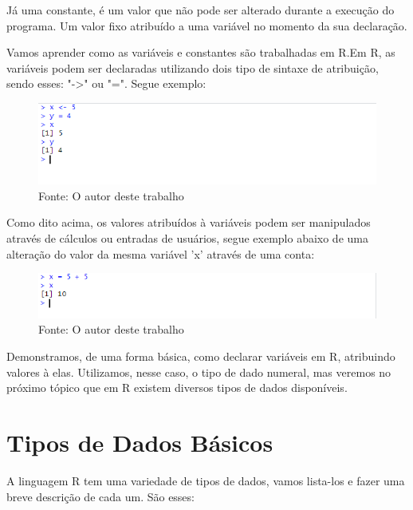 	Já uma constante, é um valor que não pode ser alterado durante a execução do programa. Um valor fixo atribuído a uma variável no momento da sua declaração. 
	
	Vamos aprender como as variáveis e constantes são trabalhadas em R.Em R, as variáveis podem ser declaradas utilizando dois tipo de sintaxe de atribuição, sendo esses: "->" ou "=".
	Segue exemplo:
	
	\begin{figure}[H]
		\centering
		\caption{}
		\includegraphics[width=1.0\linewidth]{Prints/screenshot001}
		\label{fig:screenshot001}
		{\tiny \sf Fonte: O autor deste trabalho }
	\end{figure} 
	
	
	Como dito acima, os valores atribuídos à variáveis podem ser manipulados através de cálculos ou entradas de usuários, segue exemplo abaixo de uma alteração do valor da mesma variável 'x' através de uma conta:
	\begin{figure}[H]
		\centering
		\caption{}
		\includegraphics[width=1.0\linewidth]{Prints/screenshot002}
		\label{fig:screenshot002}
		{\tiny \sf Fonte: O autor deste trabalho }
	\end{figure} 
	
	Demonstramos, de uma forma básica, como declarar variáveis em R, atribuindo valores à elas. Utilizamos, nesse caso, o tipo de dado numeral, mas veremos no próximo tópico que em R existem diversos tipos de dados disponíveis.
	

    \section{Tipos de Dados B\'{a}sicos}
    
    A linguagem R tem uma variedade de tipos de dados, vamos lista-los e fazer uma breve descrição de cada um. São esses:
